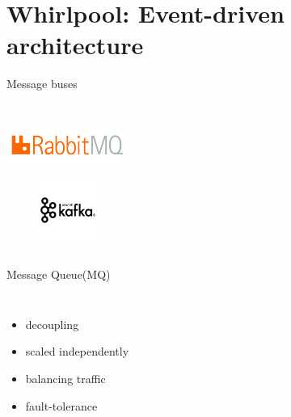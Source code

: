 \documentclass[9pt]{beamer}
\begin{document}
\section[Event-driven]{Whirlpool: Event-driven architecture}
\begin{frame}[plain]
\end{frame}


\begin{frame}{Message buses}
  \begin{columns}[t]
    \centering
    \includegraphics[width=4cm,height=2cm]{img/rmq.png}\\
    \vrule{}
    \centering
    \includegraphics[width=4cm,height=2cm]{img/kafka.png}\\
  \end{columns}
\end{frame}


\begin{frame}{Message Queue(MQ)}
  \begin{columns}
    \begin{itemize}
      \pause
    \item decoupling
      \pause
    \item scaled independently
      \pause
     \item balancing traffic
       \pause
     \item fault-tolerance
    \end{itemize}
  \end{columns}
  
\end{frame}

\end{document}
